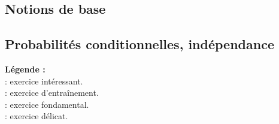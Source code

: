 \subsection{Notions de base}









\subsection{Probabilit\'es conditionnelles, ind\'ependance}












{\noindent
{\bf L\'egende :}\\

\noindent \coolexo : exercice int\'eressant.\\
\boringexo : exercice d'entra\^inement.\\
\minsyndical : exercice fondamental.\\
\mortelexo : exercice d\'elicat.}
